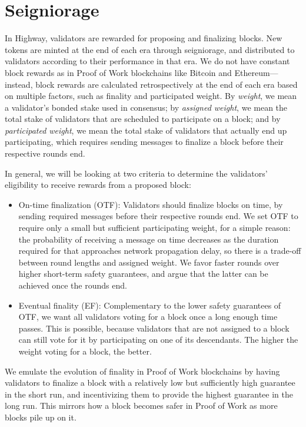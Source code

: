 \section{Seigniorage}

In Highway, validators are rewarded for proposing and finalizing blocks. New tokens are minted at the end of each era through seigniorage, and distributed to validators according to their performance in that era. We do not have constant block rewards as in Proof of Work blockchains like Bitcoin and Ethereum---instead, block rewards are calculated retrospectively at the end of each era based on multiple factors, such as finality and participated weight. By \emph{weight}, we mean a validator's bonded stake used in consensus; by \emph{assigned weight}, we mean the total stake of validators that are scheduled to participate on a block; and by \emph{participated weight}, we mean the total stake of validators that actually end up participating, which requires sending messages to finalize a block before their respective rounds end.

In general, we will be looking at two criteria to determine the validators' eligibility to receive rewards from a proposed block:

\begin{itemize}
\item
  On-time finalization (OTF): Validators should finalize blocks on time, by sending required messages before their respective rounds end. We set OTF to require only a small but sufficient participating weight, for a simple reason: the probability of receiving a message on time decreases as the duration required for that approaches network propagation delay, so there is a trade-off between round lengths and assigned weight. We favor faster rounds over higher short-term safety guarantees, and argue that the latter can be achieved once the rounds end.
\item Eventual finality (EF): Complementary to the lower safety guarantees of OTF, we want all validators voting for a block once a long enough time passes. This is possible, because validators that are not assigned to a block can still vote for it by participating on one of its descendants. The higher the weight voting for a block, the better.
\end{itemize}

We emulate the evolution of finality in Proof of Work blockchains by having validators to finalize a block with a relatively low but sufficiently high guarantee in the short run, and incentivizing them to provide the highest guarantee in the long run. This mirrors how a block becomes safer in Proof of Work as more blocks pile up on it.

